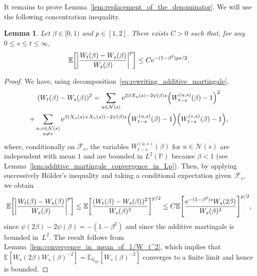 \documentclass[10pt]{amsart}
\newtheorem{lemm}[theo]{Lemma}\newtheorem{prop}[theo]{Proposition}\newtheorem{coro}[theo]{Corollary}\newtheorem{conj}[theo]{Conjecture}
\theoremstyle{definition}\newtheorem{defi}[theo]{Definition}\newtheorem{rema}[theo]{Remark}\newtheorem{exam}[theo]{Example}\newtheorem{exem}[theo]{Example}\newtheorem{nota}[theo]{Notation}
\newcommand{\e}{\mathrm{e}}
\newcommand{\E}{\mathbb{E}}
\renewcommand{\P}{\mathbb{P}}
\newcommand{\Q}{\mathbb{Q}}
\newcommand\1{\mathds{1}}
\newcommand{\cF}{\mathcal{F}}
\newcommand{\cN}{\mathcal{N}}
\newcommand{\Expec}[1]{\mathbb{E}\left[#1\right]}
\let\originalleft\left
\let\originalright\right
\renewcommand{\left}{\mathopen{}\mathclose\bgroup\originalleft}
\renewcommand{\right}{\aftergroup\egroup\originalright}
\begin{document}
It remains to prove Lemma~\ref{lem:replacement_of_the_denominator}. We will use the following concentration inequality.

\begin{lemm}\label{lem:concentration_for_ratio}
Let $\beta \in [0, 1)$ and $p \in [1, 2]$. There exists $C>0$ such that, for any $0 \leq s \leq t \leq \infty$,
\begin{equation*}
\Expec{ \left| \frac{W_t(\beta) - W_s(\beta)}{W_s(\beta)} \right|^p} \leq C \e^{-(1 - \beta^2)ps/2}.
\end{equation*}
\end{lemm}

\begin{proof}
We have, using decomposition~\eqref{eq:rewriting_additive_martingale},
\begin{multline*}
(W_t(\beta) - W_s(\beta))^2= \sum_{u \in \cN(s)} \e^{2\beta X_u(s) - 2\psi(\beta)s} \left(W_{t - s}^{(u, s)}(\beta) - 1\right)^2  \\
+ \sum_{\substack{u, v \in \cN(s)\\ u \neq v}} \e^{\beta(X_u(s) + X_v(s)) - 2\psi(\beta)s} \left(W_{t - s}^{(u, s)}(\beta) - 1\right)\left(W_{t - s}^{(v, s)}(\beta) - 1\right), 
\end{multline*}
where, conditionally on $\cF_s$, the variables $W_{t - s}^{(u,s)}(\beta)$ for $u \in \cN(s)$ are independent with mean $1$ and are bounded in $L^2(\P)$ because $\beta <1$ (see Lemma~\ref{lem:additive_martingale_convergence_in_Lp}). Then, by applying successively H\"older's inequality and taking a conditional expectation given~$\cF_s$, we obtain
\begin{equation*}
\Expec{ \left| \frac{W_t(\beta) - W_s(\beta)}{W_s(\beta)} \right|^p} \leq \Expec{\frac{(W_t(\beta) - W_s(\beta))^2}{W_s(\beta)^2}}^{p/2} \leq C \Expec{\frac{\e^{-(1 - \beta^2)s} W_s(2\beta)}{W_s(\beta)^2}}^{p/2},
\end{equation*}
since $\psi(2\beta) - 2\psi(\beta) = -(1 - \beta^2)$ and since the additive martingale is bounded in~$L^2$. The result follows from Lemma~\ref{lem:convergence_in_mean_of_1/W_t^2}, which implies that $\E[W_s(2\beta) W_s(\beta)^{-2}] = \E_{\Q_{2\beta}}[W_s(\beta)^{-2}]$ converges to a finite limit and hence is bounded.
\end{proof}
\end{document}
